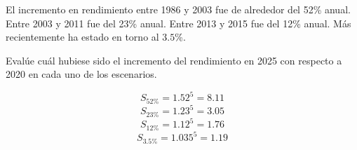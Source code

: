 \begin{acexercise}\end{acexercise}

El incremento en rendimiento entre 1986 y 2003 fue de alrededor del 52\% anual.
Entre 2003 y 2011 fue del 23\% anual.
Entre 2013 y 2015 fue del 12\% anual.
Más recientemente ha estado en torno al $3.5$\%.

Evalúe cuál hubiese sido el incremento del rendimiento en 2025 con respecto
a 2020 en cada uno de los escenarios.

\begin{acsolution}\end{acsolution}

\[S_{52\%} = 1.52^5 = 8.11\]
\[S_{23\%} = 1.23^5 = 3.05\]
\[S_{12\%} = 1.12^5 = 1.76\]
\[S_{3.5\%} = 1.035^5 = 1.19\]

